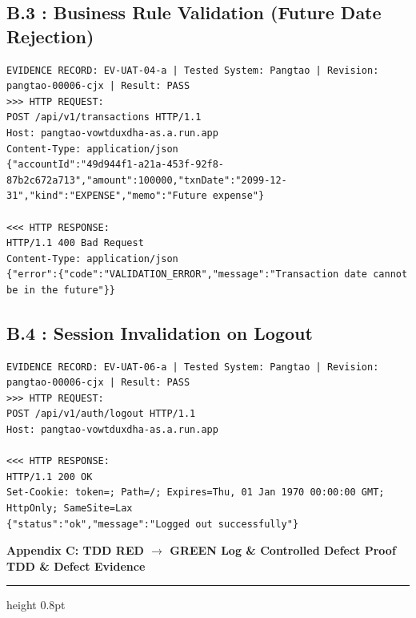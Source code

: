 \documentclass[10pt,a4paper]{article}
\newcommand{\partheader}[2]{%
  \vspace{6pt}%
  \noindent\textbf{\textcolor{tggreen}{\large #1}} \hfill \textbf{\small\textcolor{tgdark}{#2}}\par
  \vspace{3pt}\hrule height 0.8pt\vspace{6pt}%
}
\newcommand{\code}[1]{\texttt{\detokenize{#1}}}
\begin{document}
\subsection*{B.3 \code{EV-UAT-04-a}: Business Rule Validation (Future Date Rejection)}
\begin{lstlisting}
EVIDENCE RECORD: EV-UAT-04-a | Tested System: Pangtao | Revision: pangtao-00006-cjx | Result: PASS
>>> HTTP REQUEST:
POST /api/v1/transactions HTTP/1.1
Host: pangtao-vowtduxdha-as.a.run.app
Content-Type: application/json
{"accountId":"49d944f1-a21a-453f-92f8-87b2c672a713","amount":100000,"txnDate":"2099-12-31","kind":"EXPENSE","memo":"Future expense"}

<<< HTTP RESPONSE:
HTTP/1.1 400 Bad Request
Content-Type: application/json
{"error":{"code":"VALIDATION_ERROR","message":"Transaction date cannot be in the future"}}
\end{lstlisting}

\subsection*{B.4 \code{EV-UAT-06-a}: Session Invalidation on Logout}
\begin{lstlisting}
EVIDENCE RECORD: EV-UAT-06-a | Tested System: Pangtao | Revision: pangtao-00006-cjx | Result: PASS
>>> HTTP REQUEST:
POST /api/v1/auth/logout HTTP/1.1
Host: pangtao-vowtduxdha-as.a.run.app

<<< HTTP RESPONSE:
HTTP/1.1 200 OK
Set-Cookie: token=; Path=/; Expires=Thu, 01 Jan 1970 00:00:00 GMT; HttpOnly; SameSite=Lax
{"status":"ok","message":"Logged out successfully"}
\end{lstlisting}

\clearpage
\partheader{Appendix C: TDD RED $\to$ GREEN Log \& Controlled Defect Proof}{TDD \& Defect Evidence}
\end{document}
